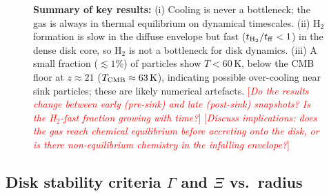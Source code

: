 \documentclass[12pt]{article}
\newcommand{\fillme}[1]{\textcolor{red}{[\textit{#1}]}}
\begin{document}
\begin{figure}[h]
{    \textbf{Summary of key results:}
    (i) Cooling is never a bottleneck; the gas is always in thermal
    equilibrium on dynamical timescales.
    (ii) H$_2$ formation is slow in the diffuse envelope but fast
    ($t_{\rm H_2}/t_{\rm ff} < 1$) in the dense disk core, so H$_2$
    is not a bottleneck for disk dynamics.
    (iii) A small fraction ($\lesssim 1\%$) of particles show $T < 60\,\mathrm{K}$,
    below the CMB floor at $z\approx21$ ($T_{\rm CMB} \approx 63\,\mathrm{K}$),
    indicating possible over-cooling near sink particles; these are likely
    numerical artefacts.
    \fillme{Do the results change between early (pre-sink) and late (post-sink)
            snapshots? Is the H$_2$-fast fraction growing with time?}
    \fillme{Discuss implications: does the gas reach chemical equilibrium
            before accreting onto the disk, or is there non-equilibrium
            chemistry in the infalling envelope?}
  }
  \label{fig:chemical_timescales}
\end{figure}

\subsection{Disk stability criteria $\Gamma$ and $\Xi$ vs.\ radius}
\end{document}
